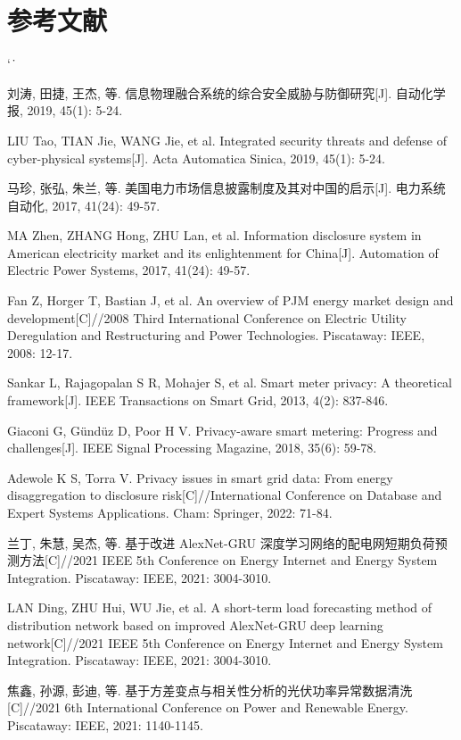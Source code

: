 \documentclass[UTF8,zihao=5,twoside]{ctexart}
\makeatletter
\numberwithin{equation}{section}
\renewcommand{\refname}{参考文献}
\renewenvironment{thebibliography}[1]{%
  \section*{\refname}%
  \small
  \list{[\arabic{enumi}]}{%
    \settowidth\labelwidth{[#1]}%
    \leftmargin\labelwidth
    \advance\leftmargin\labelsep
    \usecounter{enumi}}
  \sloppy\clubpenalty4000\widowpenalty4000\sfcode`\.\ \@m
}{\def\@noitemerr{\@latex@warning{Empty `thebibliography' environment}}\endlist}
\makeatother
\begin{document}
\balance
\begin{thebibliography}{99}
刘涛, 田捷, 王杰, 等. 信息物理融合系统的综合安全威胁与防御研究[J]. 自动化学报, 2019, 45(1): 5-24.

LIU Tao, TIAN Jie, WANG Jie, et al. Integrated security threats and defense of cyber-physical systems[J]. Acta Automatica Sinica, 2019, 45(1): 5-24.

马珍, 张弘, 朱兰, 等. 美国电力市场信息披露制度及其对中国的启示[J]. 电力系统自动化, 2017, 41(24): 49-57.

MA Zhen, ZHANG Hong, ZHU Lan, et al. Information disclosure system in American electricity market and its enlightenment for China[J]. Automation of Electric Power Systems, 2017, 41(24): 49-57.

Fan Z, Horger T, Bastian J, et al. An overview of PJM energy market design and development[C]//2008 Third International Conference on Electric Utility Deregulation and Restructuring and Power Technologies. Piscataway: IEEE, 2008: 12-17.

Sankar L, Rajagopalan S R, Mohajer S, et al. Smart meter privacy: A theoretical framework[J]. IEEE Transactions on Smart Grid, 2013, 4(2): 837-846.

Giaconi G, Gündüz D, Poor H V. Privacy-aware smart metering: Progress and challenges[J]. IEEE Signal Processing Magazine, 2018, 35(6): 59-78.

Adewole K S, Torra V. Privacy issues in smart grid data: From energy disaggregation to disclosure risk[C]//International Conference on Database and Expert Systems Applications. Cham: Springer, 2022: 71-84.

兰丁, 朱慧, 吴杰, 等. 基于改进 AlexNet-GRU 深度学习网络的配电网短期负荷预测方法[C]//2021 IEEE 5th Conference on Energy Internet and Energy System Integration. Piscataway: IEEE, 2021: 3004-3010.

LAN Ding, ZHU Hui, WU Jie, et al. A short-term load forecasting method of distribution network based on improved AlexNet-GRU deep learning network[C]//2021 IEEE 5th Conference on Energy Internet and Energy System Integration. Piscataway: IEEE, 2021: 3004-3010.

焦鑫, 孙源, 彭迪, 等. 基于方差变点与相关性分析的光伏功率异常数据清洗[C]//2021 6th International Conference on Power and Renewable Energy. Piscataway: IEEE, 2021: 1140-1145.


\end{thebibliography}
\end{document}
